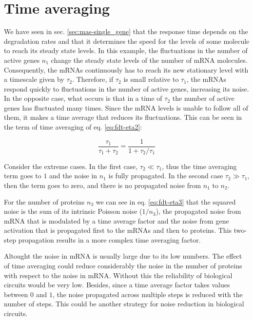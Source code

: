 \section{Time averaging}
\label{sec:fdt-time-ave}

We have seen in sec. \ref{sec:mas-single_gene} that the response time depends on the degradation rates and that it determines the speed for the levels of some molecule to reach its steady state levels. In this example, the fluctuations in the number of active genes $n_1$ change the steady state levels of the number of mRNA molecules. Consequently, the mRNAs continuously has to reach its new stationary level with a timescale given by $\tau_2$. Therefore, if $\tau_2$ is small relative to $\tau_1$, the mRNAs respond quickly to fluctuations in the number of active genes, increasing its noise. In the opposite case, what occurs is that in a time of $\tau_2$ the number of active genes has fluctuated many times. Since the mRNA levels is unable to follow all of them, it makes a time average that reduces its fluctuations. This can be seen in the term of time averaging of eq. \eqref{eq:fdt-eta2}:

\begin{equation*}
  \frac{\tau_1}{\tau_1+\tau_2} = \frac{1}{1+\tau_2/\tau_1}
\end{equation*}

Consider the extreme cases. In the first case, $\tau_2\ll\tau_1$, thus the time averaging term goes to $1$ and the noise in $n_1$ is fully propagated. In the second case $\tau_2\gg\tau_1$, then the term goes to zero, and there is no propagated noise from $n_1$ to $n_2$.

For the number of proteins $n_3$ we can see in eq. \eqref{eq:fdt-eta3} that the squared noise is the sum of its intrinsic Poisson noise ($1/n_3$), the propagated noise from mRNA that is modulated by a time average factor and the noise from gene activation that is propagated first to the mRNAs and then to proteins. This two-step propagation results in a more complex time averaging factor.

Altought the noise in mRNA is usually large due to its low numbers. The effect of time averaging could reduce considerably the noise in the number of proteins with respect to the noise in mRNA. Without this the reliability of biological circuits would be very low. Besides, since a time average factor takes values between $0$ and $1$, the noise propagated across multiple steps is reduced with the number of steps. This could be another strategy for noise reduction in biological circuits.

